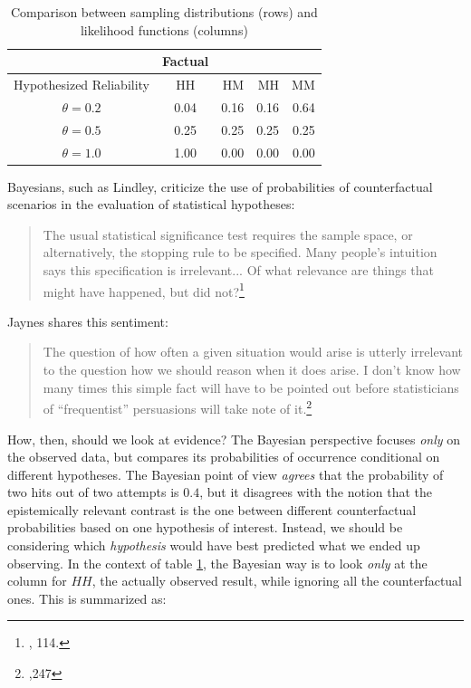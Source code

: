 \begin{table}[]
\centering
\begin{tabular}{@{}c||c|rrr@{}}
\toprule
 & Factual & \multicolumn{3}{l}{} Counterfactual\\ \midrule
Hypothesized Reliability & HH & HM      & MH      &  MM    \\\midrule
$\theta=0.2$ & 0.04 &   0.16    &   0.16    &    0.64  \\
 $\theta=0.5$& 0.25 &    0.25   &   0.25    &    0.25  \\
 $\theta=1.0$& 1.00 &   0.00    &   0.00    &   0.00   \\ \bottomrule
\end{tabular}
  \label{tab:likelihoodvscf}
  \caption{Comparison between sampling distributions (rows) and likelihood functions (columns)}
\end{table}

Bayesians, such as Lindley, criticize the use of probabilities of counterfactual scenarios in the evaluation of statistical hypotheses:


\begin{quote}
The usual statistical significance test requires the sample space, or alternatively, the stopping rule to be specified. Many people's intuition says this specification is irrelevant... Of what relevance are things that might have happened, but did not?\footnote{\cite{lindleybern}, 114.}
\end{quote}

Jaynes shares this sentiment:

\begin{quote}
The question of how often a given situation would arise is utterly
irrelevant to the question how we should reason when it does arise. I
don't know how many times this simple fact will have to be pointed out
before statisticians of ``frequentist'' persuasions will take note of
it.\footnote{\cite{jaynesmight},247}
\end{quote}

How, then, should we look at evidence? The Bayesian perspective focuses \emph{only} on the observed data, but compares its probabilities of occurrence conditional on different hypotheses. The Bayesian point of view \emph{agrees} that the probability of two hits out of two attempts is $0.4$, but it disagrees with the notion that the epistemically relevant contrast is the one between different counterfactual probabilities based on one hypothesis of interest. Instead, we should be considering which \emph{hypothesis} would have best predicted what we ended up observing. In the context of table \ref{tab:likelihoodvscf}, the Bayesian way is to look \emph{only} at the column for $HH$, the actually observed result, while ignoring all the counterfactual ones. This is summarized as: 

